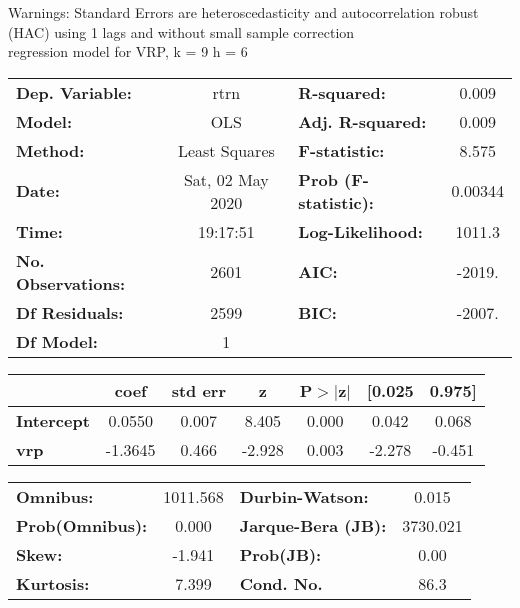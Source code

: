 Warnings: \newline
 [1] Standard Errors are heteroscedasticity and autocorrelation robust (HAC) using 1 lags and without small sample correction\\ 

regression model for VRP, k = 9 h = 6\begin{center}
\begin{tabular}{lclc}
\toprule
\textbf{Dep. Variable:}    &       rtrn       & \textbf{  R-squared:         } &     0.009   \\
\textbf{Model:}            &       OLS        & \textbf{  Adj. R-squared:    } &     0.009   \\
\textbf{Method:}           &  Least Squares   & \textbf{  F-statistic:       } &     8.575   \\
\textbf{Date:}             & Sat, 02 May 2020 & \textbf{  Prob (F-statistic):} &  0.00344    \\
\textbf{Time:}             &     19:17:51     & \textbf{  Log-Likelihood:    } &    1011.3   \\
\textbf{No. Observations:} &        2601      & \textbf{  AIC:               } &    -2019.   \\
\textbf{Df Residuals:}     &        2599      & \textbf{  BIC:               } &    -2007.   \\
\textbf{Df Model:}         &           1      & \textbf{                     } &             \\
\bottomrule
\end{tabular}
\begin{tabular}{lcccccc}
                   & \textbf{coef} & \textbf{std err} & \textbf{z} & \textbf{P$> |$z$|$} & \textbf{[0.025} & \textbf{0.975]}  \\
\midrule
\textbf{Intercept} &       0.0550  &        0.007     &     8.405  &         0.000        &        0.042    &        0.068     \\
\textbf{vrp}       &      -1.3645  &        0.466     &    -2.928  &         0.003        &       -2.278    &       -0.451     \\
\bottomrule
\end{tabular}
\begin{tabular}{lclc}
\textbf{Omnibus:}       & 1011.568 & \textbf{  Durbin-Watson:     } &    0.015  \\
\textbf{Prob(Omnibus):} &   0.000  & \textbf{  Jarque-Bera (JB):  } & 3730.021  \\
\textbf{Skew:}          &  -1.941  & \textbf{  Prob(JB):          } &     0.00  \\
\textbf{Kurtosis:}      &   7.399  & \textbf{  Cond. No.          } &     86.3  \\
\bottomrule
\end{tabular}
\end{center}

